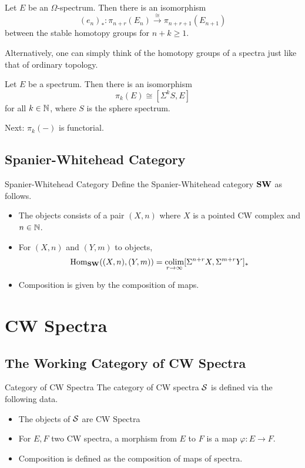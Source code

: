 \documentclass[a4paper]{article}
\begin{document}
\begin{lmm}{}{} Let $E$ be an $\Omega$-spectrum. Then there is an isomorphism $$(e_n)_\ast:\pi_{n+r}(E_n)\overset{\cong}{\longrightarrow}\pi_{n+r+1}(E_{n+1})$$ between the stable homotopy groups for $n+k\geq 1$. 
\end{lmm}

Alternatively, one can simply think of the homotopy groups of a spectra just like that of ordinary topology. 

\begin{prp}{}{} Let $E$ be a spectrum. Then there is an isomorphism $$\pi_k(E)\cong[\Sigma^k S,E]$$ for all $k\in\mathbb{N}$, where $S$ is the sphere spectrum. 
\end{prp}

Next: $\pi_k(-)$ is functorial. 

\subsection{Spanier-Whitehead Category}
\begin{defn}{Spanier-Whitehead Category}{} Define the Spanier-Whitehead category $\bold{SW}$ as follows. 
\begin{itemize}
\item The objects consists of a pair $(X,n)$ where $X$ is a pointed CW complex and $n\in\mathbb{N}$. 
\item For $(X,n)$ and $(Y,m)$ to objects, $$\operatorname{Hom}_{\bold{SW}}((X,n),(Y,m))=\operatorname*{colim}_{r\to\infty}[\Sigma^{n+r}X,\Sigma^{m+r}Y]_\ast$$
\item Composition is given by the composition of maps. 
\end{itemize}
\end{defn}

\pagebreak
\section{CW Spectra}
\subsection{The Working Category of CW Spectra}
\begin{defn}{Category of CW Spectra}{} The category of CW spectra $\mathcal{S}$ is defined via the following data. 
\begin{itemize}
\item The objects of $\mathcal{S}$ are CW Spectra
\item For $E,F$ two CW spectra, a morphism from $E$ to $F$ is a map $\varphi:E\to F$. 
\item Composition is defined as the composition of maps of spectra. 
\end{itemize}
\end{defn}
\end{document}

